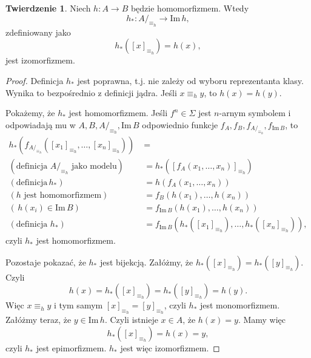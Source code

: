 \documentclass{book}
\theoremstyle{definition}
\newtheorem{theorem}{Twierdzenie}[section]
\begin{document}
\begin{theorem}\label{th:isomorphism}
	Niech $h: A \to B$ będzie homomorfizmem.
	Wtedy
	\begin{equation}
		h_*: A/_{\equiv_h} \to \mathrm{Im}\,h,
	\end{equation}
	zdefiniowany jako
	\begin{equation}
		h_*([x]_{\equiv_h}) = h(x),
	\end{equation}
	jest izomorfizmem.
\end{theorem}
\begin{proof}
	Definicja $h_*$ jest poprawna,
		t.j. nie zależy od wyboru reprezentanta klasy.
	Wynika to bezpośrednio z definicji jądra.
	Jeśli $x \equiv_h y$, to $h(x) = h(y)$.

	Pokażemy, że $h_*$ jest homomorfizmem.
	Jeśli $f^n \in \Sigma$ jest $n$-arnym symbolem
		i odpowiadają mu w $A, B, A/_{\equiv_h}, \mathrm{Im}\,B$
		odpowiednio funkcje $f_A, f_B, f_{A/_{\equiv_h}}, f_{\mathrm{Im}\,B}$,
		to
	\begin{align}
		h_*(f_{A/_{\equiv_h}}([x_1]_{\equiv_h}, \dots, [x_n]_{\equiv_h})) &= \\
			(\text{definicja $A/_{\equiv_h}$ jako modelu})\qquad &= h_*([f_A(x_1, \dots, x_n)]_{\equiv_h}) \\
			(\text{definicja}\,h_*)\qquad &= h(f_A(x_1, \dots, x_n)) \\
			(\text{$h$ jest homomorfizmem})\qquad &= f_B(h(x_1), \dots, h(x_n)) \\
			(\,h(x_i) \in \mathrm{Im}\,B)\qquad &= f_{\mathrm{Im}\,B}(h(x_1), \dots, h(x_n)) \\
			(\text{definicja $h_*$})\qquad &= f_{\mathrm{Im}\,B}(h_*([x_1]_{\equiv_h}), \dots, h_*([x_n]_{\equiv_h})),
	\end{align}
	czyli $h_*$ jest homomorfizmem.

	Pozostaje pokazać,
		że $h_*$ jest bijekcją.
	Załóżmy, że $h_*([x]_{\equiv_h}) = h_*([y]_{\equiv_h})$.
	Czyli
	\begin{equation}
		h(x) = h_*([x]_{\equiv_h}) = h_*([y]_{\equiv_h}) = h(y).
	\end{equation}
	Więc $x \equiv_h y$ i tym samym $[x]_{\equiv_h} = [y]_{\equiv_h}$, czyli
		$h_*$ jest monomorfizmem.
	Załóżmy teraz,
		że $y \in \mathrm{Im}\,h$.
	Czyli istnieje $x \in A$, że $h(x) = y$.
	Mamy więc
	\begin{equation}
		h_*([x]_{\equiv_h}) = h(x) = y,
	\end{equation}
	czyli $h_*$ jest epimorfizmem.
	$h_*$ jest więc izomorfizmem.
\end{proof}
\end{document}
